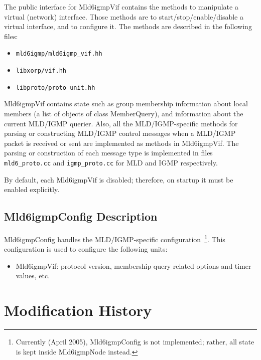 \documentclass[11pt]{article}
\begin{document}
The public interface for Mld6igmpVif contains the methods to manipulate a
virtual (network) interface. Those methods are to start/stop/enable/disable a
virtual interface, and to configure it. The methods are described in
the following files:

\begin{itemize}
  \item \verb=mld6igmp/mld6igmp_vif.hh=
  \item \verb=libxorp/vif.hh=
  \item \verb=libproto/proto_unit.hh=
\end{itemize}

Mld6igmpVif contains state such as group membership information about
local members (a list of objects of class MemberQuery), and information
about the current MLD/IGMP querier. Also, all 
the MLD/IGMP-specific methods for parsing or constructing MLD/IGMP control
messages when a MLD/IGMP packet is received or sent are implemented as
methods in Mld6igmpVif. The parsing or construction of each message type is
implemented in files \verb=mld6_proto.cc= and \verb=igmp_proto.cc=
for MLD and IGMP respectively.

By default, each Mld6igmpVif is disabled; therefore, on startup it must
be enabled explicitly.


\subsection{Mld6igmpConfig Description}

Mld6igmpConfig handles the MLD/IGMP-specific
configuration~\footnote{Currently (April 2005), Mld6igmpConfig is not
implemented; rather, all state is kept inside Mld6igmpNode instead.}. This
configuration is used to configure the following units:

\begin{itemize}

  \item Mld6igmpVif: protocol version, membership query related options
  and timer values, etc.

\end{itemize}


\appendix
\section{Modification History}
\end{document}
